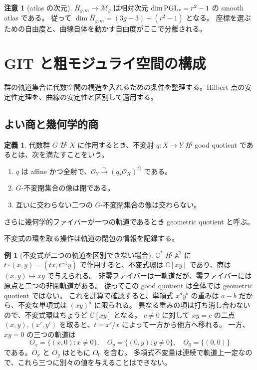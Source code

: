 \documentclass[dvipdfmx,a4paper,11pt]{article}
\theoremstyle{definition}
\newtheorem{dfn}[thm]{定義}
\newtheorem{exa}[thm]{例}
\newtheorem{rem}[thm]{注意}
\newenvironment{aim}{\begin{tcolorbox}[mybox,colback=green!3,title=この章で考えること,fonttitle=\bfseries]}{\end{tcolorbox}}
\newcommand{\C}{\mathbb C}\newcommand{\R}{\mathbb R}\newcommand{\Z}{\mathbb Z}\newcommand{\Q}{\mathbb Q}
\newcommand{\OO}{\mathcal O}\newcommand{\MM}{\mathcal M}\newcommand{\TT}{\mathcal T}
\newcommand{\A}{\mathbb A}
\newcommand{\cM}{\overline{\mathcal M}}
\begin{document}
\begin{rem}[atlas の次元]
$\overline H_{g,m}\to\cM_g$ は相対次元 $\dim\operatorname{PGL}_r=r^2-1$ の smooth atlas である。
従って $\dim\overline H_{g,m}=(3g-3)+(r^2-1)$ となる。
座標を選ぶための自由度と、曲線自体を動かす自由度がここで分離される。
\end{rem}

\par\bigskip\Needspace{.70\textheight}
\section{GIT と粗モジュライ空間の構成}\label{sec:git}
\begin{aim}
群の軌道集合に代数空間の構造を入れるための条件を整理する。Hilbert 点の安定性定理を、曲線の安定性と区別して適用する。
\end{aim}
\subsection{よい商と幾何学的商}
\begin{dfn}
代数群 $G$ が $X$ に作用するとき、不変射 $q:X\to Y$ が good quotient であるとは、次を満たすことをいう。
\begin{enumerate}
\item $q$ は affine かつ全射で、$\OO_Y\xrightarrow{\sim}(q_*\OO_X)^G$ である。
\item $G$-不変閉集合の像は閉である。
\item 互いに交わらない二つの $G$-不変閉集合の像は交わらない。
\end{enumerate}
さらに幾何学的ファイバーが一つの軌道であるとき geometric quotient と呼ぶ。
\end{dfn}
不変式の環を取る操作は軌道の閉包の情報を記録する。
\begin{exa}[不変式が二つの軌道を区別できない場合]
$\C^*$ が $\A^2$ に $t\cdot(x,y)=(tx,t^{-1}y)$ で作用すると、不変式環は $\C[xy]$ であり、商は $(x,y)\mapsto xy$ で与えられる。
非零ファイバーは一軌道だが、零ファイバーには原点と二つの非閉軌道がある。
従ってこの good quotient は全体では geometric quotient ではない。
これを計算で確認すると、単項式 $x^ay^b$ の重みは $a-b$ だから、不変な単項式は $(xy)^a$ に限られる。
異なる重みの項は打ち消し合わないので、不変式環はちょうど $\C[xy]$ となる。
$c\neq0$ に対して $xy=c$ の二点 $(x,y),(x',y')$ を取ると、$t=x'/x$ によって一方から他方へ移れる。
一方、$xy=0$ の三つの軌道は
\[
O_x=\{(x,0):x\neq0\},\quad
O_y=\{(0,y):y\neq0\},\quad O_0=\{(0,0)\}
\]
である。$\overline O_x$ と $\overline O_y$ はともに $O_0$ を含む。
多項式不変量は連続で軌道上一定なので、これら三つに別々の値を与えることはできない。
\end{exa}
\end{document}
